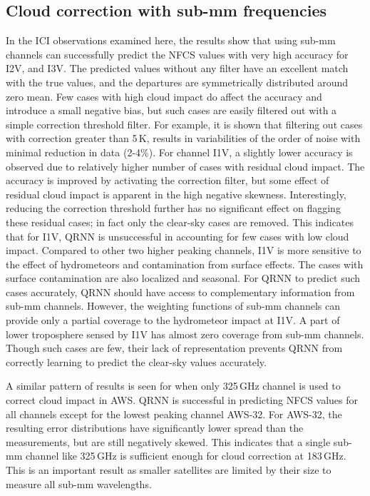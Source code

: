 \documentclass[amt, manuscript]{copernicus}
\begin{document}
\subsection{Cloud correction with sub-mm frequencies }
%
In the ICI observations examined here, the results show that using sub-mm channels can successfully predict the NFCS values with very high accuracy for I2V, and I3V. The predicted values without any filter have an excellent match with the true values, and the departures are symmetrically distributed around zero mean. Few cases with high cloud impact do affect the accuracy and introduce a small negative bias, but such cases are easily filtered out with a simple correction threshold filter. For example, it is shown that filtering out cases with correction greater than 5\,K, results in variabilities of the order of noise with minimal reduction in data (2-4\%). For channel I1V, a slightly lower accuracy is observed due to relatively higher number of cases with residual cloud impact. The accuracy is improved by activating the correction filter, but some effect of residual cloud impact is apparent in the high negative skewness. Interestingly, reducing the correction threshold further has no significant effect on flagging these residual cases; in fact only the clear-sky cases are removed. This indicates that for I1V, QRNN is unsuccessful in accounting for few cases with low cloud impact. Compared to other two higher peaking channels, I1V is more sensitive to the effect of hydrometeors  and contamination from surface effects. The cases with surface contamination are also localized and seasonal. For QRNN to predict such cases accurately, QRNN should have access to complementary information from sub-mm channels. However, the weighting functions of sub-mm channels can provide only a partial coverage to the hydrometeor impact at I1V. A part of lower troposphere sensed by I1V has almost zero coverage from sub-mm channels. Though such cases are few, their lack of representation prevents QRNN from correctly learning to predict the clear-sky values accurately.

A similar pattern of results is seen for when only 325\,GHz channel is used to correct cloud impact in AWS. QRNN is successful in predicting NFCS values for all channels except for the lowest peaking channel AWS-32. For AWS-32, the resulting error distributions have significantly lower spread than the measurements, but are still negatively skewed. This indicates that a single sub-mm channel like 325\,GHz is sufficient enough for cloud correction at 183\,GHz. This is an important result as smaller satellites are limited by their size to measure all sub-mm wavelengths.
\end{document}
